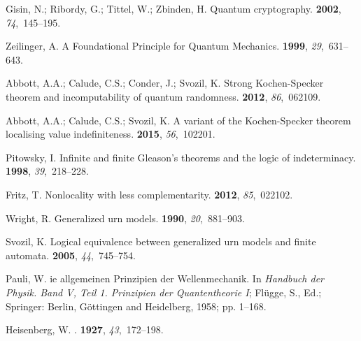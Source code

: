 \documentclass[information,article,submit,moreauthors,pdftex,12pt,a4paper]{mdpi}
\theoremstyle{mdpi}
\newcounter{re}
\theoremstyle{mdpidefinition}
\begin{document}
\begin{thebibliography}{-------}
Gisin, N.; Ribordy, G.; Tittel, W.; Zbinden, H.
\newblock Quantum cryptography.
 {\bf 2002}, {\em 74},~145--195.

Zeilinger, A.
\newblock A Foundational Principle for Quantum Mechanics.
 {\bf 1999}, {\em 29},~631--643.

Abbott, A.A.; Calude, C.S.; Conder, J.; Svozil, K.
\newblock Strong {K}ochen-{S}pecker theorem and incomputability of quantum
  randomness.
 {\bf 2012}, {\em 86},~062109.

Abbott, A.A.; Calude, C.S.; Svozil, K.
\newblock A variant of the {K}ochen-{S}pecker theorem localising value
  indefiniteness.
 {\bf 2015}, {\em 56},~102201.

Pitowsky, I.
\newblock Infinite and finite {G}leason's theorems and the logic of
  indeterminacy.
 {\bf 1998}, {\em 39},~218--228.

Fritz, T.
\newblock Nonlocality with less complementarity.
 {\bf 2012}, {\em 85},~022102.

Wright, R.
\newblock Generalized urn models.
 {\bf 1990}, {\em 20},~881--903.

Svozil, K.
\newblock Logical equivalence between generalized urn models and finite
  automata.
 {\bf 2005}, {\em
  44},~745--754.

Pauli, W.
ie allgemeinen {P}rinzipien der {W}ellenmechanik. In {\em
  {H}andbuch der {P}hysik. {B}and {V}, {T}eil 1. {P}rinzipien der
  {Q}uantentheorie {I}}; Fl{\"{u}}gge, S., Ed.; Springer: Berlin,
  G{\"{o}}ttingen and Heidelberg,  1958; pp. 1--168.

Heisenberg, W.
.
 {\bf 1927}, {\em 43},~172--198.


\end{thebibliography}
\end{document}
